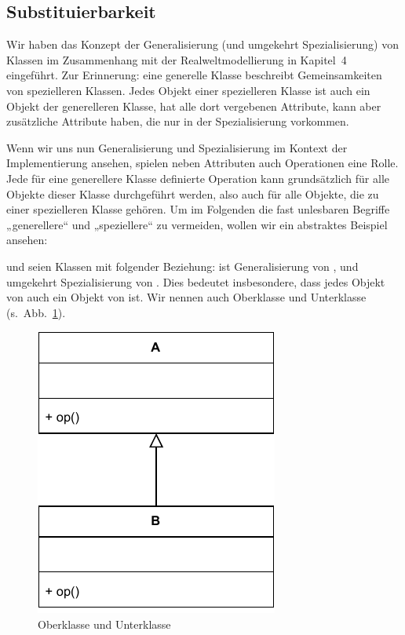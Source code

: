 \subsection{Substituierbarkeit}
\label{sec:Kap-9.2.2}

Wir haben das Konzept der Generalisierung (und umgekehrt Spezialisierung) von Klassen im Zusammenhang mit der Realweltmodellierung in Kapitel~4 %
eingeführt. Zur Erinnerung: eine generelle Klasse beschreibt Gemeinsamkeiten von spezielleren Klassen. Jedes Objekt einer spezielleren Klasse ist auch ein Objekt der generelleren Klasse, hat alle dort vergebenen Attribute, kann aber zusätzliche Attribute haben, die nur in der Spezialisierung vorkommen.

Wenn wir uns nun Generalisierung und Spezialisierung im Kontext der Implementierung ansehen, spielen neben Attributen auch Operationen eine Rolle. Jede für eine generellere Klasse definierte Operation kann grundsätzlich für alle Objekte dieser Klasse durchgeführt werden, also auch für alle Objekte, die zu einer spezielleren Klasse gehören. Um im Folgenden die fast unlesbaren Begriffe „generellere“ und „speziellere“ zu vermeiden, wollen wir ein abstraktes Beispiel ansehen:

 und  seien Klassen mit folgender Beziehung:  ist Generalisierung von , und umgekehrt  Spezialisierung von . Dies bedeutet insbesondere, dass jedes Objekt von  auch ein Objekt von  ist. Wir nennen  auch Oberklasse und  Unterklasse (s.~Abb.~\ref{fig:oberklasse_unterklasse}).

\vspace{-2mm} %

\begin{figure}[h!]
	\centering
	\includegraphics{Bilder/Kapitel-9/oberklasse_unterklasse.pdf}
	\caption{Oberklasse  und Unterklasse }
	\label{fig:oberklasse_unterklasse}
\end{figure}

